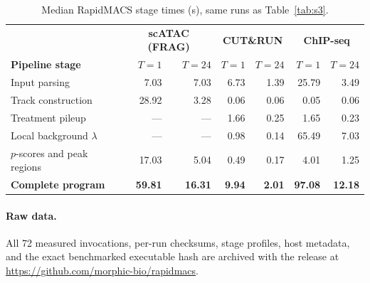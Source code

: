 \documentclass[10pt]{article}
\begin{document}
\begin{table}[h]
\centering
\small
\caption{Median RapidMACS stage times (s), same runs as Table~\ref{tab:s3}.\label{tab:s4}}
\setlength{\tabcolsep}{4pt}
\begin{tabular}{@{}p{}rrrrrr@{}}
\toprule
& \multicolumn{2}{c}{\textbf{scATAC (FRAG)}} & \multicolumn{2}{c}{\textbf{CUT\&RUN}} & \multicolumn{2}{c}{\textbf{ChIP-seq}} \\
\textbf{Pipeline stage} & $T{=}1$ & $T{=}24$ & $T{=}1$ & $T{=}24$ & $T{=}1$ & $T{=}24$ \\
\midrule
Input parsing & 7.03 & 7.03 & 6.73 & 1.39 & 25.79 & 3.49 \\
Track construction & 28.92 & 3.28 & 0.06 & 0.06 & 0.05 & 0.06 \\
Treatment pileup & --- & --- & 1.66 & 0.25 & 1.65 & 0.23 \\
Local background $\lambda$ & --- & --- & 0.98 & 0.14 & 65.49 & 7.03 \\
$p$-scores and peak regions & 17.03 & 5.04 & 0.49 & 0.17 & 4.01 & 1.25 \\
\midrule
\textbf{Complete program} & \textbf{59.81} & \textbf{16.31} & \textbf{9.94} & \textbf{2.01} & \textbf{97.08} & \textbf{12.18} \\
\bottomrule
\end{tabular}
\end{table}

\paragraph{Raw data.}
All 72 measured invocations, per-run checksums, stage profiles, host metadata, and the exact benchmarked executable hash are archived with the release at \url{https://github.com/morphic-bio/rapidmacs}.
\end{document}
